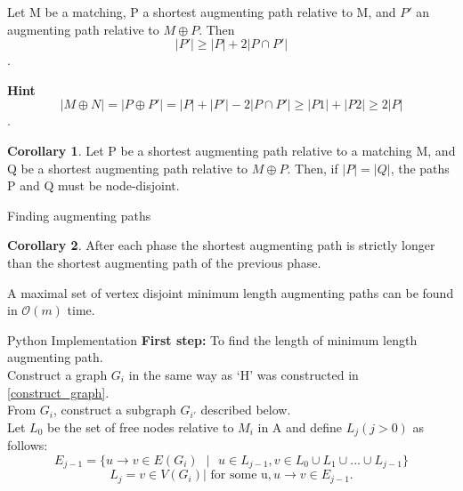 \documentclass[11pt]{beamer}
\theoremstyle{definition}
\newtheorem{cor}{Corollary}[theorem]
\begin{document}
\begin{frame}
\begin{theorem}\label{minlenshpath}
Let M be a matching, P a shortest augmenting path relative to
M, and $P'$ an augmenting path relative to $M \oplus P$. Then
$$|P'| \geq |P| + 2|P \cap P'|$$.\\
\end{theorem} 
\textbf{Hint}  $$|M \oplus N|=|P\oplus P'|=|P|+|P'|-2|P \cap P'| \geq |P1|+|P2| \geq 2|P|$$.


\begin{cor} Let P be a shortest augmenting path relative to a matching M, and Q be a shortest augmenting path relative to $M \oplus P$. Then, if $|P| = |Q|$, the paths P and Q must be node-disjoint.
\end{cor}




\end{frame}

\begin{frame}{Finding augmenting paths}\label{construct_graph}
\begin{cor} After each phase the shortest augmenting path is strictly longer than the shortest augmenting path of the previous phase.
\end{cor}

\begin{theorem}A maximal set of vertex disjoint minimum length augmenting paths can be found in $\mathcal{O}(m)$ time.	
\end{theorem}

\end{frame}



\begin{frame}{Python Implementation}
\textbf{First step:} To find the length of minimum length augmenting path.\\
Construct a graph $G_i$ in the same way as `H' was constructed in \ref{construct_graph}.\\
From $G_i$, construct a subgraph $G_{i'}$ described below.\\
Let $L_0$ be the set of free nodes relative to $M_i$ in A and define $L_j (j > 0)$ as follows:
$$E_{j-1} = \{u \rightarrow v \in E(G_i)\mbox{ } | \mbox{ } u \in  L_{j-1}, v \in L_0 \cup L_1 \cup ...\cup L_{j-1}\}$$
$$L_j = {v \in V(G_i) |\mbox{ for some u}, u \rightarrow v \in E_{j-1}}.$$
\end{frame}
\end{document}

